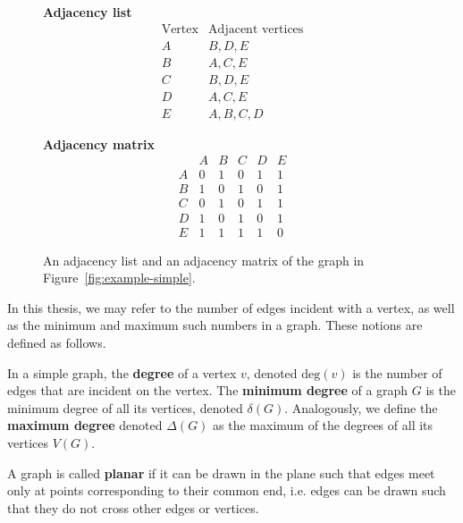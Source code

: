 \begin{figure}
\centering

\begin{minipage}{0.35\textwidth}
\centering
\textbf{Adjacency list}
\[
\begin{array}{c|l}
\text{Vertex} & \text{Adjacent vertices}\\
\hline
A & B,D,E\\
B & A,C,E\\
C & B,D,E\\
D & A,C,E\\
E & A,B,C,D
\end{array}
\]
\end{minipage}
\qquad
\begin{minipage}{0.4\textwidth}
\centering
\textbf{Adjacency matrix}
\[
\begin{array}{c|ccccc}
 & A&B&C&D&E\\
\hline
A&0&1&0&1&1\\
B&1&0&1&0&1\\
C&0&1&0&1&1\\
D&1&0&1&0&1\\
E&1&1&1&1&0
\end{array}
\]
\end{minipage}

\caption{An adjacency list and an adjacency matrix of the graph in Figure~\ref{fig:example-simple}.}
\label{fig:adjacency}
\end{figure}

In this thesis, we may refer to the number of edges incident with a vertex, as well as the minimum and maximum such numbers in a graph. These notions are defined as follows.

\begin{definition}[Degree]
  In a simple graph, the \textbf{degree} of a vertex $v$, denoted $\text{deg}(v)$ is the number of edges that are incident on the vertex. The \textbf{minimum degree} of a graph $G$ is the minimum degree of all its vertices, denoted $\delta(G)$. Analogously, we define the \textbf{maximum degree} denoted $\Delta(G)$ as the maximum of the degrees of all its vertices $V(G)$.
\end{definition}

\begin{definition}
  A graph is called \textbf{planar} if it can be drawn in the plane such that edges meet only at points corresponding to their common end, i.e. edges can be drawn such that they do not cross other edges or vertices.
\end{definition}

